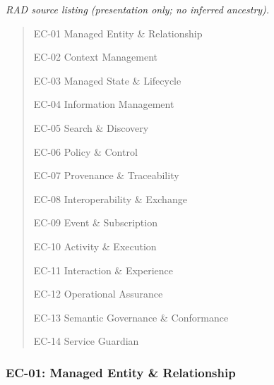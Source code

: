 \textit{RAD source listing (presentation only; no inferred ancestry).}
\begin{quote}
EC-01  Managed Entity \& Relationship

EC-02  Context Management

EC-03  Managed State \& Lifecycle

EC-04  Information Management

EC-05  Search \& Discovery

EC-06  Policy \& Control

EC-07  Provenance \& Traceability

EC-08  Interoperability \& Exchange

EC-09  Event \& Subscription

EC-10  Activity \& Execution

EC-11  Interaction \& Experience

EC-12  Operational Assurance

EC-13  Semantic Governance \& Conformance

EC-14  Service Guardian
\end{quote}
\label{rad:enterprise:101}

\par\smallskip
{}\label{rad:enterprise:103}
\subsubsection*{EC-01: Managed Entity \& Relationship}
\label{rad:enterprise:104}

